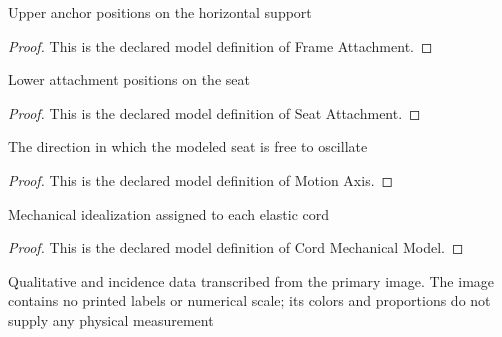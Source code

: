 \begin{definition}
  \label{def:physics:phyx-mini-0283:phyxminiproblems-problemphyxmini0283-frameattachment}
  Upper anchor positions on the horizontal support
\end{definition}
\begin{proof}
  This is the declared model definition of Frame Attachment.
\end{proof}
\begin{definition}
  \label{def:physics:phyx-mini-0283:phyxminiproblems-problemphyxmini0283-seatattachment}
  Lower attachment positions on the seat
\end{definition}
\begin{proof}
  This is the declared model definition of Seat Attachment.
\end{proof}
\begin{definition}
  \label{def:physics:phyx-mini-0283:phyxminiproblems-problemphyxmini0283-motionaxis}
  The direction in which the modeled seat is free to oscillate
\end{definition}
\begin{proof}
  This is the declared model definition of Motion Axis.
\end{proof}
\begin{definition}
  \label{def:physics:phyx-mini-0283:phyxminiproblems-problemphyxmini0283-cordmechanicalmodel}
  Mechanical idealization assigned to each elastic cord
\end{definition}
\begin{proof}
  This is the declared model definition of Cord Mechanical Model.
\end{proof}
\begin{definition}
  \label{def:physics:phyx-mini-0283:phyxminiproblems-problemphyxmini0283-jumpseatfigure}
  Qualitative and incidence data transcribed from the primary image. The image contains no printed labels or numerical scale; its colors and proportions do not supply any physical measurement
\end{definition}
